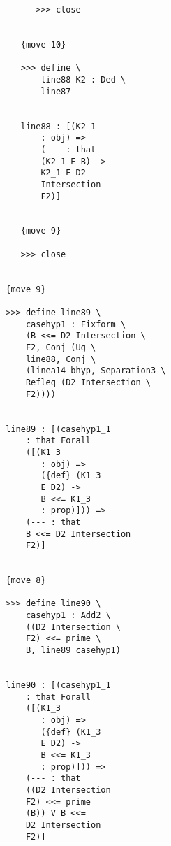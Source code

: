 \documentclass[12pt]{article}
\begin{document}
\begin{verbatim}
                                 >>> close


                              {move 10}

                              >>> define \
                                  line88 K2 : Ded \
                                  line87


                              line88 : [(K2_1 
                                  : obj) => 
                                  (--- : that 
                                  (K2_1 E B) -> 
                                  K2_1 E D2 
                                  Intersection 
                                  F2)]


                              {move 9}

                              >>> close


                           {move 9}

                           >>> define line89 \
                               casehyp1 : Fixform \
                               (B <<= D2 Intersection \
                               F2, Conj (Ug \
                               line88, Conj \
                               (linea14 bhyp, Separation3 \
                               Refleq (D2 Intersection \
                               F2))))


                           line89 : [(casehyp1_1 
                               : that Forall 
                               ([(K1_3 
                                  : obj) => 
                                  ({def} (K1_3 
                                  E D2) -> 
                                  B <<= K1_3 
                                  : prop)])) => 
                               (--- : that 
                               B <<= D2 Intersection 
                               F2)]


                           {move 8}

                           >>> define line90 \
                               casehyp1 : Add2 \
                               ((D2 Intersection \
                               F2) <<= prime \
                               B, line89 casehyp1)


                           line90 : [(casehyp1_1 
                               : that Forall 
                               ([(K1_3 
                                  : obj) => 
                                  ({def} (K1_3 
                                  E D2) -> 
                                  B <<= K1_3 
                                  : prop)])) => 
                               (--- : that 
                               ((D2 Intersection 
                               F2) <<= prime 
                               (B)) V B <<= 
                               D2 Intersection 
                               F2)]



\end{verbatim}
\end{document}

